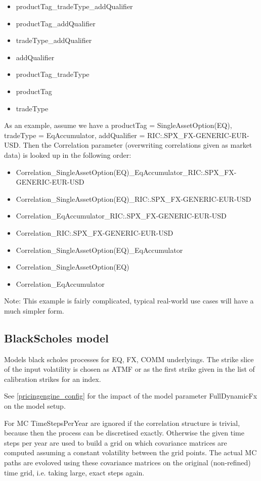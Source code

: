 \begin{itemize}
\item productTag\_tradeType\_addQualifier
\item productTag\_addQualifier
\item tradeType\_addQualifier
\item addQualifier
\item productTag\_tradeType
\item productTag
\item tradeType
\end{itemize}

As an example, assume we have a productTag = SingleAssetOption(EQ), tradeType = EqAccumulator, addQualifier =
RIC:.SPX\_FX-GENERIC-EUR-USD. Then the Correlation parameter (overwriting correlations given as market data) is looked
up in the following order:

\begin{itemize}
\item Correlation\_SingleAssetOption(EQ)\_EqAccumulator\_RIC:.SPX\_FX-GENERIC-EUR-USD
\item Correlation\_SingleAssetOption(EQ)\_RIC:.SPX\_FX-GENERIC-EUR-USD
\item Correlation\_EqAccumulator\_RIC:.SPX\_FX-GENERIC-EUR-USD
\item Correlation\_RIC:.SPX\_FX-GENERIC-EUR-USD
\item Correlation\_SingleAssetOption(EQ)\_EqAccumulator
\item Correlation\_SingleAssetOption(EQ)
\item Correlation\_EqAccumulator
\end{itemize}

Note: This example is fairly complicated, typical real-world use cases will have a much simpler form.

\subsection{BlackScholes model}\label{blackscholes}

Models black scholes processes for EQ, FX, COMM underlyings. The strike slice of the input volatility is chosen as ATMF
or as the first strike given in the list of calibration strikes for an index.

See \ref{pricingengine_config} for the impact of the model parameter FullDynamicFx on the model setup.

For MC TimeStepsPerYear are ignored if the correlation structure is trivial, because then the process can be discretised
exactly. Otherwise the given time steps per year are used to build a grid on which covariance matrices are computed
assuming a constant volatility between the grid points. The actual MC paths are evoloved using these covariance matrices
on the original (non-refined) time grid, i.e. taking large, exact steps again.

